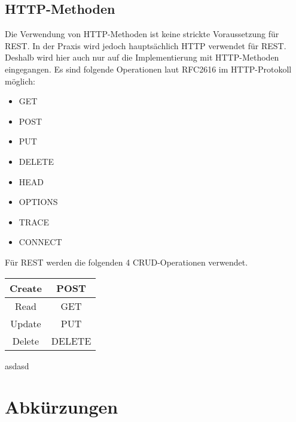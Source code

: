 \documentclass[]{article}
\begin{document}
	\subsection{\ac{HTTP}-Methoden}
	Die Verwendung von \ac{HTTP}-Methoden ist keine strickte Voraussetzung für REST.
	In der Praxis wird jedoch hauptsächlich \ac{HTTP} verwendet für REST. Deshalb wird hier auch nur auf die Implementierung mit \ac{HTTP}-Methoden eingegangen.
	\newline \newline
	Es sind folgende Operationen laut RFC2616\cite{RFC2616} im \ac{HTTP}-Protokoll möglich:
	\begin{itemize} 
		\setlength{\itemsep}{0pt} 
		\item GET
		\item POST
		\item PUT
		\item DELETE
		\item HEAD
		\item OPTIONS
		\item TRACE
		\item CONNECT
	\end{itemize}
	\begin{center}
	Für \ac{REST} werden die folgenden 4 \ac{CRUD}-Operationen verwendet. 
	\newline \newline
	\begin{tabular}{|c|c|}
		\hline 
		Create & POST \\ 
		\hline 
		Read & GET \\ 
		\hline 
		Update & PUT \\ 
		\hline 
		Delete & DELETE \\ 
		\hline 
	\end{tabular} 
	\end{center}
	\newpage
	asdasd
	
	\newpage
	
	\setcounter{secnumdepth}{0}	%
	\section{Abkürzungen}
	\begin{acronym}[HTTP]
	\end{acronym}
	\newpage
	

	
	
\end{document}
